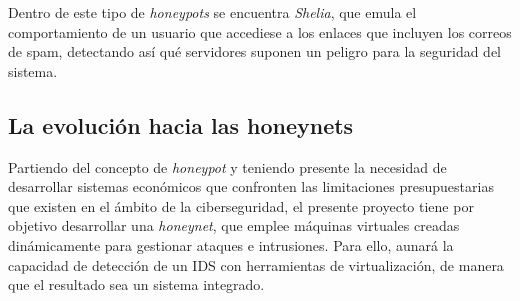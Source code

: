 Dentro de este tipo de \textit{honeypots} se encuentra \textit{Shelia}, que emula el comportamiento de un usuario que accediese a los enlaces que incluyen los correos de spam, detectando así qué servidores suponen un peligro para la seguridad del sistema\cite{shelia}.  

\subsection{La evolución hacia las honeynets}
Partiendo del concepto de \textit{honeypot} y teniendo presente la necesidad de desarrollar sistemas económicos que confronten las limitaciones presupuestarias que existen en el ámbito de la ciberseguridad, el presente proyecto tiene por objetivo desarrollar una \textit{honeynet}, que emplee máquinas virtuales creadas dinámicamente para gestionar ataques e intrusiones. Para ello, aunará la capacidad de detección de un IDS con herramientas de virtualización, de manera que el resultado sea un sistema integrado. 